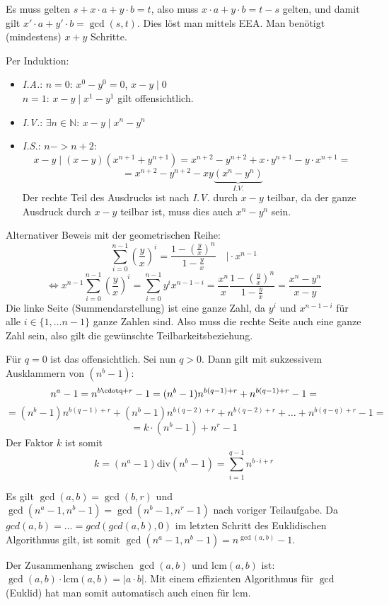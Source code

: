 \begin{flushenum}
\begin{flushalpha}
	\item Es muss gelten $s + x\cdot a + y \cdot b = t$, also muss $x\cdot a + y\cdot b = t-s$ gelten,
	und damit gilt $x'\cdot a + y' \cdot b = \gcd(s,t)$. Dies
	löst man mittels EEA. Man benötigt (mindestens) $x+y$ Schritte.
\end{flushalpha}

\item 
\begin{flushalpha}
\item Per Induktion:
\begin{itemize}
	\item \textit{I.A.}: $n=0$: $x^0 - y^0 = 0$, $x-y \mid 0$ \\ $n=1$: $x-y \mid x^1 - y^1$ gilt offensichtlich.
	\item \textit{I.V.}: $\exists n \in \mathbb{N}$: $x-y \mid x^n - y^n$
	\item \textit{I.S.}: $n -> n+2$:
	\[ x-y \mid (x-y)(x^{n+1} + y^{n+1}) = x^{n+2} - y^{n+2} + x\cdot y^{n+1} - y \cdot x^{n+1} =\]
	\[ = x^{n+2} - y^{n+2} - xy \underbrace{(x^{n} - y^{n})}_{I.V.}\]
	Der rechte Teil des Ausdrucks ist nach \textit{I.V.} durch $x-y$ teilbar, da der ganze Ausdruck durch $x-y$ teilbar ist, muss dies auch $x^n - y^n$ sein.
\end{itemize}
Alternativer Beweis mit der geometrischen Reihe:
\[ \sum_{i=0}^{n-1}\left(\frac{y}{x}\right)^i = \frac{1-\left(\frac{y}{x}\right)^n}{1-\frac{y}{x}} \quad \vert \cdot x^{n-1}\]
\[ \Leftrightarrow x^{n-1}  \sum_{i=0}^{n-1}\left(\frac{y}{x}\right)^i = \sum_{i=0}^{n-1} y^ix^{n-1-i} = \frac{x^n}{x}  \frac{1-\left(\frac{y}{x}\right)^n}{1-\frac{y}{x}}  = \frac{x^n - y^n}{x-y} \]
Die linke Seite (Summendarstellung) ist eine ganze Zahl, da $y^i$ und $x^{n-1-i}$ für alle $i \in \{1, \ldots n-1\}$ ganze Zahlen sind. Also muss
die rechte Seite auch eine ganze Zahl sein, also gilt die gewünschte Teilbarkeitsbeziehung.

\item Für $q=0$ ist das offensichtlich. Sei nun $q>0$. Dann gilt mit sukzessivem Ausklammern von $(n^b - 1)$:
\[ n^a - 1 = n^{b\cdotq + r} - 1 = (n^b - 1)n^{b(q-1) + r} + n^{b(q-1) + r} - 1 =\]\[=  (n^b - 1)n^{b(q-1) + r} + (n^b - 1)n^{b(q-2) + r} + n^{b(q-2) + r} + \ldots
+n^{b(q-q) + r} - 1 =\]\[= k \cdot (n^b-1) + n^r - 1 \]
Der Faktor $k$ ist somit \[ k = (n^a-1) \text{div} (n^b -1) = \sum_{i=1}^{q-1} n^{b\cdot i + r} \]
\item Es gilt $\gcd(a,b) = \gcd(b,r)$ und $\gcd(n^a-1,n^b-1) = \gcd(n^b-1,n^r-1)$ nach voriger Teilaufgabe.
Da $gcd(a,b) = \ldots = gcd( gcd(a,b), 0)$ im letzten Schritt des Euklidischen Algorithmus gilt, ist somit $\gcd(n^a -1,n^b-1) = n^{\gcd(a,b)}-1$.
\end{flushalpha}
\item Der Zusammenhang zwischen $\gcd(a,b)$ und $\text{lcm}(a,b)$ ist: $\gcd(a,b) \cdot \text{lcm}(a,b) = |a \cdot b|$. Mit einem effizienten Algorithmus für $\gcd$ (Euklid)
hat man somit automatisch auch einen für $\text{lcm}$.


\end{flushenum}
